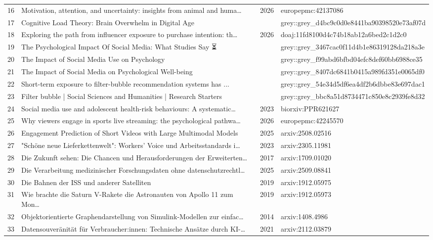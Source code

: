 \documentclass[11pt,a4paper]{article}
\begin{document}
\begin{longtable}{r p{} c p{}}
16 & Motivation, attention, and uncertainty: insights from animal and huma… & 2026 & europepmc:42137086 \\
17 & Cognitive Load Theory: Brain Overwhelm in Digital Age &  & grey::grey\_d4bc9c0d0e8441ba90398520e73af07d \\
18 & Exploring the path from influencer exposure to purchase intention: th… & 2026 & doaj:11fd8100d4c74b18ab12a6bed2c1d2c0 \\
19 & The Psychological Impact Of Social Media: What Studies Say ⏳ &  & grey::grey\_3467cac0f11d4b1e86319128da218a3e \\
20 & The Impact of Social Media Use on Psychology &  & grey::grey\_f99abd6bfbd04efc8def60bb6988ce35 \\
21 & The Impact of Social Media on Psychological Well-being &  & grey::grey\_8407dc6841b0415a989fd351e0065df0 \\
22 & Short-term exposure to filter-bubble recommendation systems has ... &  & grey::grey\_54e34d5df6ea4df2b6dbbe83e697dac1 \\
23 & Filter bubble | Social Sciences and Humanities | Research Starters &  & grey::grey\_bbc8a51d8734471c850e8c2939fe8d32 \\
24 & Social media use and adolescent health-risk behaviours: A systematic… & 2023 & biorxiv:PPR621627 \\
25 & Why viewers engage in sports live streaming: the psychological pathwa… & 2026 & europepmc:42245570 \\
26 & Engagement Prediction of Short Videos with Large Multimodal Models & 2025 & arxiv:2508.02516 \\
27 & "Schöne neue Lieferkettenwelt": Workers' Voice und Arbeitsstandards i… & 2023 & arxiv:2305.11981 \\
28 & Die Zukunft sehen: Die Chancen und Herausforderungen der Erweiterten… & 2017 & arxiv:1709.01020 \\
29 & Die Verarbeitung medizinischer Forschungsdaten ohne datenschutzrechtl… & 2025 & arxiv:2509.08841 \\
30 & Die Bahnen der ISS und anderer Satelliten & 2019 & arxiv:1912.05975 \\
31 & Wie brachte die Saturn V-Rakete die Astronauten von Apollo 11 zum Mon… & 2019 & arxiv:1912.05973 \\
32 & Objektorientierte Graphendarstellung von Simulink-Modellen zur einfac… & 2014 & arxiv:1408.4986 \\
33 & Datensouveränität für Verbraucher:innen: Technische Ansätze durch KI-… & 2021 & arxiv:2112.03879 \\

\end{longtable}
\end{document}
